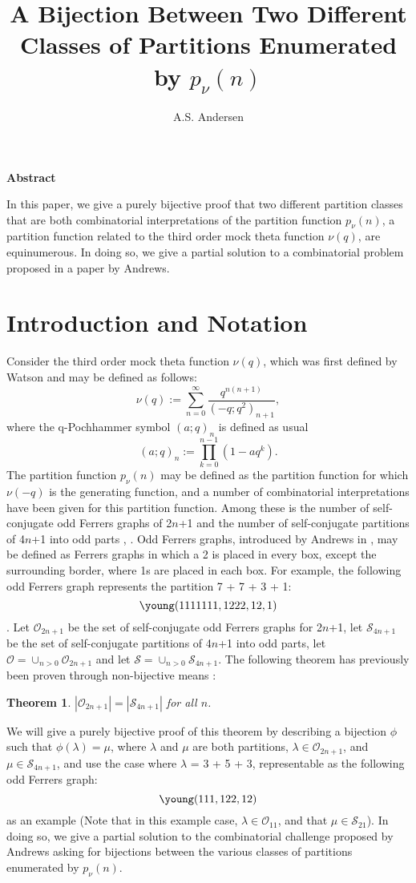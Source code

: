 \documentclass[11pt]{article}
\title{A Bijection Between Two Different Classes of Partitions Enumerated by $p_\nu(n)$}
\author{A.S. Andersen}
\newtheorem{theorem}{Theorem}
\begin{document}
\maketitle
\centerline{\bf Abstract}
In this paper, we give a purely bijective proof that two different partition classes that are both combinatorial interpretations of the partition function $p_\nu(n)$, a partition function related to the third order mock theta function $\nu(q)$, are equinumerous. In doing so, we give a partial solution to a combinatorial problem proposed in a paper by Andrews.
\section{Introduction and Notation}
Consider the third order mock theta function $\nu(q)$, which was first defined by Watson \cite{4} and may be defined as follows:
\begin{equation}
\nu(q) := \sum\limits_{n=0}^{\infty}\frac{q^{n(n+1)}}{(-q;q^2)_{n+1}} ,
\end{equation}
where the q-Pochhammer symbol $(a;q)_n$ is defined as usual
\begin{equation}
(a;q)_n := \prod\limits_{k=0}^{n-1}(1-aq^k) .
\end{equation}
The partition function $p_\nu(n)$ may be defined as the partition function for which $\nu(-q)$ is the generating function, and a number of combinatorial interpretations have been given for this partition function. Among these is the number of self-conjugate odd Ferrers graphs of 2$n$+1 and the number of self-conjugate partitions of 4$n$+1 into odd parts \cite{2}, \cite{3}. Odd Ferrers graphs, introduced by Andrews in \cite{1}, may be defined as Ferrers graphs in which a 2 is placed in every box, except the surrounding border, where 1s are placed in each box. For example, the following odd Ferrers graph represents the partition 7 + 7 + 3 + 1:
\[\young(1111111,1222,12,1)\]. Let $\mathcal{O}_{2n+1}$ be the set of self-conjugate odd Ferrers graphs for 2$n$+1, let $\mathcal{S}_{4n+1}$ be the set of self-conjugate partitions of 4$n$+1 into odd parts, let $\mathcal{O} = \cup_{n > 0}\mathcal{O}_{2n+1}$ and let $\mathcal{S} = \cup_{n > 0}\mathcal{S}_{4n+1}$. The following theorem has previously been proven through non-bijective means \cite{2} :  
\begin{theorem}
$|\mathcal{O}_{2n+1}| = |\mathcal{S}_{4n+1}|$ for all $n$.
\end{theorem}
We will give a purely bijective proof of this theorem by describing a bijection $\phi$ such that $\phi(\lambda) = \mu$, where $\lambda$ and $\mu$ are both partitions, $\lambda \in \mathcal{O}_{2n+1}$, and $\mu \in \mathcal{S}_{4n+1}$, and use the case where $\lambda$ = 3 + 5 + 3, representable as the following odd Ferrers graph:
\[\young(111,122,12)\] 
as an example (Note that in this example case, $\lambda \in \mathcal{O}_{11}$, and that $\mu \in \mathcal{S}_{21}$). In doing so,  we give a partial solution to the combinatorial challenge proposed by Andrews \cite{2} asking for bijections between the various classes of partitions enumerated by $p_\nu(n)$.
\end{document}
